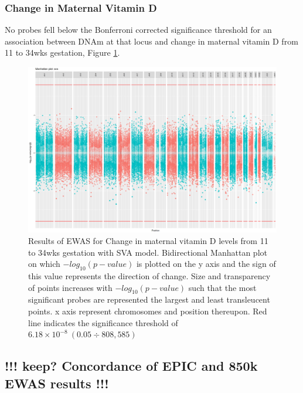 \documentclass[
]{book}
\begin{document}
\hypertarget{change-in-maternal-vitamin-d}{%
\subsubsection{Change in Maternal Vitamin D}\label{change-in-maternal-vitamin-d}}

No probes fell below the Bonferroni corrected significance threshold for an association between DNAm at that locus and change in maternal vitamin D from 11 to 34wks gestation, Figure \ref{fig:MAVIDOSdifVDEPICewasManhattanSVA}.

\begin{figure}

{\centering \includegraphics[width=0.8\linewidth]{figs/MAVIDOSdifVDEPICewasManhattanSVA} 

}

\caption{Results of EWAS for Change in maternal vitamin D levels from 11 to 34wks gestation with SVA model. Bidirectional Manhattan plot on which \(-log_{10}(p-value)\) is plotted on the y axis and the sign of this value represents the direction of change. Size and transparency of points increases with \(-log_{10}(p-value)\) such that the most significant probes are represented the largest and least transleucent points. x axis represent chromosomes and position thereupon. Red line indicates the significance threshold of \(6.18\times10^{-8}~(0.05\div808,585)\)}\label{fig:MAVIDOSdifVDEPICewasManhattanSVA}
\end{figure}



\hypertarget{keep-concordance-of-epic-and-850k-ewas-results}{%
\subsection{!!! keep? Concordance of EPIC and 850k EWAS results !!!}\label{keep-concordance-of-epic-and-850k-ewas-results}}
\end{document}

